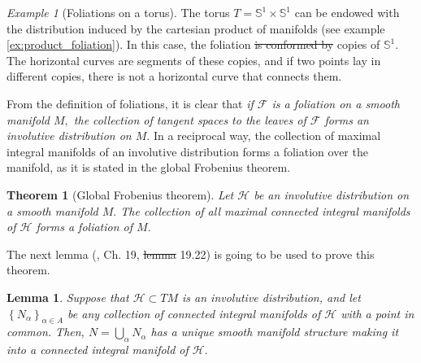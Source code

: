 \documentclass[12pt, letterpaper, reqno]{amsart}
\theoremstyle{definition}
\theoremstyle{plain}
\newtheorem{thm}{Theorem}
\newtheorem{lm}{Lemma}
\theoremstyle{remark}
\newtheorem{ex}{Example}
\providecommand{\DIFadd}[1]{{\protect\color{blue}\uwave{#1}}} %
\providecommand{\DIFdel}[1]{{\protect\color{red}\sout{#1}}}                      %
\providecommand{\DIFaddbegin}{} %
\providecommand{\DIFaddend}{} %
\providecommand{\DIFdelbegin}{} %
\providecommand{\DIFdelend}{} %
\newcommand{\DIFscaledelfig}{0.5}
\newlength{\DIFdelgraphicswidth} %
\newlength{\DIFdelgraphicsheight} %
\newcommand{\DIFaddincludegraphics}[2][]{{\color{blue}\fbox{\DIFOincludegraphics[#1]{#2}}}} %
\newcommand{\DIFdelincludegraphics}[2][]{%
\sbox{\DIFdelgraphicsbox}{\DIFOincludegraphics[#1]{#2}}%
\settoboxwidth{\DIFdelgraphicswidth}{\DIFdelgraphicsbox} %
\settoboxtotalheight{\DIFdelgraphicsheight}{\DIFdelgraphicsbox} %
\scalebox{\DIFscaledelfig}{%
\parbox[b]{\DIFdelgraphicswidth}{\usebox{\DIFdelgraphicsbox}\\[-\baselineskip] \rule{\DIFdelgraphicswidth}{0em}}\llap{\resizebox{\DIFdelgraphicswidth}{\DIFdelgraphicsheight}{%
\setlength{\unitlength}{\DIFdelgraphicswidth}%
\begin{picture}(1,1)%
\thicklines\linethickness{2pt} %
{\color[rgb]{1,0,0}\put(0,0){\framebox(1,1){}}}%
{\color[rgb]{1,0,0}\put(0,0){\line( 1,1){1}}}%
{\color[rgb]{1,0,0}\put(0,1){\line(1,-1){1}}}%
\end{picture}%
}\hspace*{3pt}}} %
} %
\DeclareRobustCommand{\DIFaddbegin}{\DIFOaddbegin \let\includegraphics\DIFaddincludegraphics} %
\DeclareRobustCommand{\DIFaddend}{\DIFOaddend \let\includegraphics\DIFOincludegraphics} %
\DeclareRobustCommand{\DIFdelbegin}{\DIFOdelbegin \let\includegraphics\DIFdelincludegraphics} %
\DeclareRobustCommand{\DIFdelend}{\DIFOaddend \let\includegraphics\DIFOincludegraphics} %
\begin{document}
\begin{ex}[Foliations on a torus]
	The torus $ T= \mathbb{S}^1\times \mathbb{S}^1 $ can be endowed with the distribution induced by the cartesian product of manifolds (see example \ref{ex:product_foliation}). In this case, the foliation \DIFdelbegin \DIFdel{is conformed by }\DIFdelend \DIFaddbegin \DIFadd{consists of }\DIFaddend copies of $ \mathbb{S}^1. $ The horizontal curves are segments of these copies, and if two points lay in different copies, there is not a horizontal curve that connects them.
\end{ex}

From the definition of foliations, it is clear that \textit{if $ \mathcal{F} $ is a foliation on a smooth manifold $ M, $ the collection of tangent spaces to the leaves of $ \mathcal{F} $ forms an involutive distribution on $ M. $} In a reciprocal way, the collection of maximal integral manifolds of an involutive distribution forms a foliation over the manifold, as it is stated in the global Frobenius theorem.

\begin{thm}[Global Frobenius theorem]
	Let $ \mathcal{H} $ be an involutive distribution on a smooth manifold $ M. $ The collection of all maximal connected integral manifolds of $ \mathcal{H} $ forms a foliation of $ M. $ 
\end{thm}

The next lemma (\cite{lee2003introduction}, Ch. 19, \DIFdelbegin \DIFdel{lemma }\DIFdelend \DIFaddbegin \DIFadd{Lemma }\DIFaddend 19.22) is going to be used to prove this theorem.

\begin{lm}\label{lm:man_struct}
	Suppose that $ \mathcal{H}\subset TM $ is an involutive distribution, and let $ \left\{ N_\alpha \right\}_{\alpha\in A} $ be any collection of connected integral manifolds of $ \mathcal{H} $ with a point in common. Then, $ N=\bigcup_{\alpha} N_\alpha $ has a unique smooth manifold structure making it into a connected integral manifold of $ \mathcal{H}. $  
\end{lm}
\end{document}
